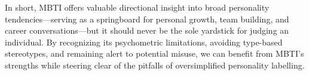\documentclass[12pt]{article}
\numberwithin{figure}{section}  %
\begin{document}
In short, MBTI offers valuable directional insight into broad personality tendencies—serving as a springboard for personal growth, team building, and career conversations—but it should never be the sole yardstick for judging an individual. By recognizing its psychometric limitations, avoiding type-based stereotypes, and remaining alert to potential misuse, we can benefit from MBTI’s strengths while steering clear of the pitfalls of oversimplified personality labelling.

	
	
\end{document}
